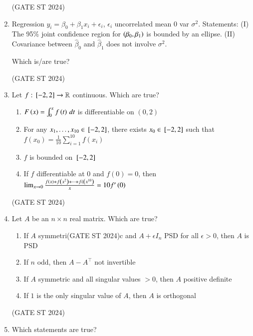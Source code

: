 \documentclass[journal,12pt,onecolumn]{IEEEtran}
\theoremstyle{remark}
\begin{document}
\begin{enumerate}
\begin{enumerate}
\end{enumerate}
\hfill (GATE ST 2024)
\item
Regression $y_i = \beta_0 + \beta_1 x_i + \epsilon_i$, $\epsilon_i$ uncorrelated mean 0 var $\sigma^2$.  
Statements:  
(I) The 95\% joint confidence region for $\left(\beta_0,\beta_1\right)$ is bounded by an ellipse.  
(II) Covariance between $\hat{\beta}_0$ and $\hat{\beta}_1$ does not involve $\sigma^2$.

Which is/are true?

\begin{enumerate}
\end{enumerate}
\hfill (GATE ST 2024)
\item
Let $f:{}\left[-2,2\right]\to\mathbb{R}$ continuous. Which are true?

\begin{enumerate}
\item $F\left(x\right) = \int_0^x f\left(t\right)\,dt$ is differentiable on $(0,2)$
\item For any $x_1,\dots,x_{10}\in{}\left[-2,2\right]$, there exists $x_0\in{}\left[-2,2\right]$ such that $f(x_0) = \frac1{10}\sum_{i=1}^{10} f(x_i)$
\item $f$ is bounded on ${}\left[-2,2\right]$
\item If $f$ differentiable at 0 and $f(0)=0$, then $\lim_{x\to0} \frac{f\left(x\right)+f\left(x^2\right)+\dots+f(\left(x^{10}\right)}{x} = 10f'\left(0\right)$
\end{enumerate}
\hfill (GATE ST 2024)
\item
Let $A$ be an $n\times n$ real matrix. Which are true?

\begin{enumerate}
\item If $A$ symmetri\hfill (GATE ST 2024)c and $A+\epsilon I_n$ PSD for all $\epsilon>0$, then $A$ is PSD  
\item If $n$ odd, then $A-A^\top$ not invertible  
\item If $A$ symmetric and all singular values $>0$, then $A$ positive definite  
\item If $1$ is the only singular value of $A$, then $A$ is orthogonal
\end{enumerate}
\hfill (GATE ST 2024)
\item
Which statements are true?


\end{enumerate}
\end{document}
